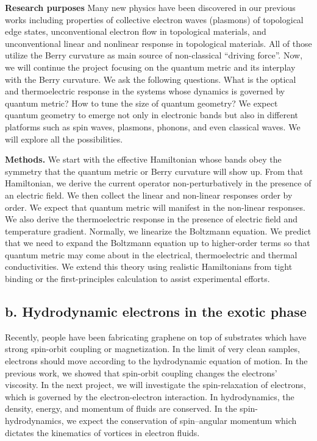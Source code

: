 \documentclass[a4paper,11pt]{article}
\begin{document}
{\bf Research purposes} Many new physics have been discovered in our
previous works including properties of collective electron waves
(plasmons) of topological edge states, unconventional electron flow in
topological materials, and unconventional linear and nonlinear
response in topological materials. All of those utilize the Berry
curvature as main source of non-classical ``driving force''. Now, we
will continue the project focusing on the quantum metric and its
interplay with the Berry curvature. We ask the following
questions. What is the optical and thermoelectric response in the
systems whose dynamics is governed by quantum metric? How to tune the
size of quantum geometry? We expect quantum geometry to emerge not
only in electronic bands but also in different platforms such as spin
waves, plasmons, phonons, and even classical waves. We will explore
all the possibilities.

{\bf Methods.} We start with the effective Hamiltonian whose bands obey the symmetry
that the quantum metric or Berry curvature will show up. From that
Hamiltonian, we derive the current operator non-perturbatively in the
presence of an electric field. We then collect the linear and non-linear
responses order by order. We expect that quantum metric will manifest
in the non-linear responses. We also derive the thermoelectric response in
the presence of electric field and temperature gradient. Normally, we
linearize the Boltzmann equation. We predict that we need to expand
the Boltzmann equation up to higher-order terms so that quantum metric may
come about in the electrical, thermoelectric and thermal
conductivities.  We extend this theory using realistic Hamiltonians
from tight binding or the first-principles calculation to assist
experimental efforts.

\subsection*{b. Hydrodynamic electrons in the exotic phase}

Recently, people have been fabricating graphene on top of substrates which have
strong spin-orbit coupling or magnetization. In the limit of very
clean samples, electrons should move according to the hydrodynamic
equation of motion. In the previous work, we showed that spin-orbit
coupling changes the electrons' viscosity. In the next project, we will
investigate the spin-relaxation of electrons, which is governed by the
electron-electron interaction. In hydrodynamics, the density, energy,
and momentum of fluids are conserved. In the spin-hydrodynamics, we
expect the conservation of spin--angular momentum which dictates the
kinematics of vortices in electron fluids. 
\end{document}
